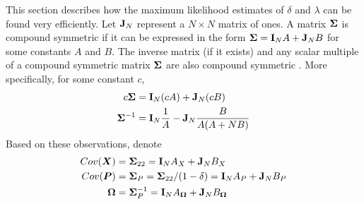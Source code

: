 \documentclass[12pt]{article}
\theoremstyle{definition}
\theoremstyle{definition}
\begin{document}


This section describes how the maximum likelihood estimates of $\delta$ and $\lambda$ can be found very efficiently. Let ${\bf J}_N$ represent a $N\times N$ matrix of ones. A matrix ${\bf\Sigma}$ is compound symmetric if it can be expressed in the form ${\bf\Sigma} = {\bf I}_NA + {\bf J}_NB$ for some constants $A$ and $B$. The inverse matrix (if it exists) and any scalar multiple of a compound symmetric matrix ${\bf\Sigma}$ are also compound symmetric \citep{dobbin2005sample}. More specifically, for some constant $c$,
\begin{align}
c {\bf\Sigma} &= {\bf I}_N(cA) + {\bf J}_N(cB) \nonumber\\
{\bf\Sigma}^{-1} &= {\bf I}_N\frac{1}{A} - {\bf J}_N \frac{B}{A(A+NB)} \label{CSInv}
\end{align}
Based on these observations, denote 
\begin{align}
Cov(\boldsymbol{X}) &= {\bf\Sigma}_{22} = {\bf I}_N A_X + {\bf J}_N  B_X \nonumber\\
Cov(\boldsymbol{P}) &= {\bf\Sigma}_{P} = {\bf\Sigma}_{22}/(1-\delta) = {\bf I}_N A_P + {\bf J}_N  B_P \label{SigmaP}\\
{\bf\Omega} &= {\bf\Sigma}_{P}^{-1} = {\bf I}_N A_{\bf\Omega} + {\bf J}_N  B_{\bf\Omega} \nonumber
\end{align}
\end{document}
